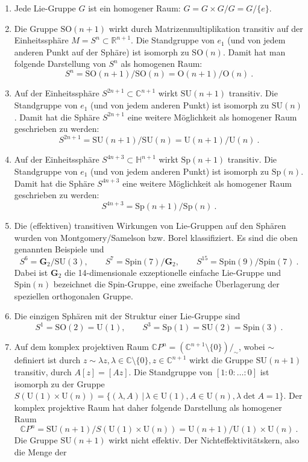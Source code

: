 \documentclass[12pt,a4paper]{article}
\def\R{\mathbb{R}}
\def\C{\mathbb{C}}
\def\H{\mathbb{H}}
\def\O{\mathrm{O}}
\def\SO{\mathrm{SO}}
\def\Spin{\mathrm{Spin}}
\def\SU{\mathrm{SU}}
\def\Sp{\mathrm{Sp}}
\def\U{\mathrm{U}}
\def\G{\mathrm{G}}
\def\G{\mathbf{G}}
\begin{document}
\begin{enumerate}
\item
Jede Lie-Gruppe $G$ ist ein homogener Raum: $G=G \times G/G = G/\{e\}$.
\item
Die Gruppe $\SO(n+1)$ wirkt durch
Matrizenmultiplikation transitiv auf der Einheitssph\"are
$M = S^n \subset \R^{n+1}$. Die Standgruppe von $e_1$
(und von jedem anderen Punkt auf der Sph\"are) ist isomorph
zu $\SO(n)$. Damit hat man folgende Darstellung von
$S^n$ als homogenen Raum:
$$
S^n = \SO(n+1)/\SO(n) = \O(n+1)/\O(n) \ .
$$
\item
Auf der Einheitssph\"are $S^{2n+1}\subset \C^{n+1}$ wirkt $\SU(n+1)$ transitiv. Die
Standgruppe von $e_1$ (und von jedem anderen Punkt) ist isomorph zu
$\SU(n)$. Damit hat die Sph\"are $S^{2n+1}$ eine weitere M\"oglichkeit
als homogener Raum geschrieben zu werden:
$$
S^{2n+1} = \SU(n+1)/\SU(n) = \U(n+1)/\U(n) \ .
$$
\item
Auf der Einheitssph\"are $S^{4n+3}\subset \H^{n+1}$ wirkt $\Sp(n+1)$ transitiv. Die
Standgruppe von $e_1$ (und von jedem anderen Punkt) ist isomorph zu
$\Sp(n)$. Damit hat die Sph\"are $S^{4n+3}$ eine weitere M\"oglichkeit
als homogener Raum geschrieben zu werden:
$$
S^{4n+3} = \Sp(n+1)/\Sp(n)  \ .
$$
\item
Die (effektiven) transitiven Wirkungen von Lie-Gruppen auf den Sph\"aren wurden von
Montgomery/Samelson bzw. Borel klassifiziert. Es sind die oben genannten Beispiele
und
$$
S^6 = \G_2/\SU(3),\qquad S^7 = \Spin(7)/\G_2,\qquad S^{15} = \Spin(9)/\Spin(7) \ .
$$
Dabei ist $\G_2$ die 14-dimensionale exzeptionelle einfache Lie-Gruppe und $\Spin(n)$
bezeichnet die Spin-Gruppe, eine zweifache \"Uberlagerung der speziellen orthogonalen
Gruppe.
\item
Die einzigen Sph\"aren mit der Struktur einer Lie-Gruppe sind
$$
S^1 = \SO(2) = \U(1), \qquad S^3 = \Sp(1) = \SU(2) = \Spin(3) \ .
$$
\item
Auf dem komplex projektiven Raum $\C P^n = (\C^{n+1}\setminus \{0\})/_\sim$, wobei $\sim$
definiert ist durch $z \sim \lambda z,
\lambda \in \C \setminus \{0\}, z \in \C^{n+1}$ wirkt die Gruppe $\SU(n+1)$ transitiv,
durch $A [z] = [Az]$. Die
Standgruppe von $[1:0:\ldots :0]$ ist isomorph zu der Gruppe
$S(\U(1) \times \U(n)) = \{(\lambda, A)\,|\, \lambda \in \U(1), A \in \U(n), \lambda \det A = 1\}$.
Der komplex projektive Raum hat daher folgende Darstellung als homogener Raum
$$
\C P^n = \SU(n+1)/S(\U(1) \times \U(n)) = \U(n+1)/ \U(1) \times \U(n) \ .
$$
Die Gruppe $\SU(n+1)$ wirkt nicht effektiv. Der Nichteffektivit\"atskern, also die Menge der

\end{enumerate}
\end{document}

